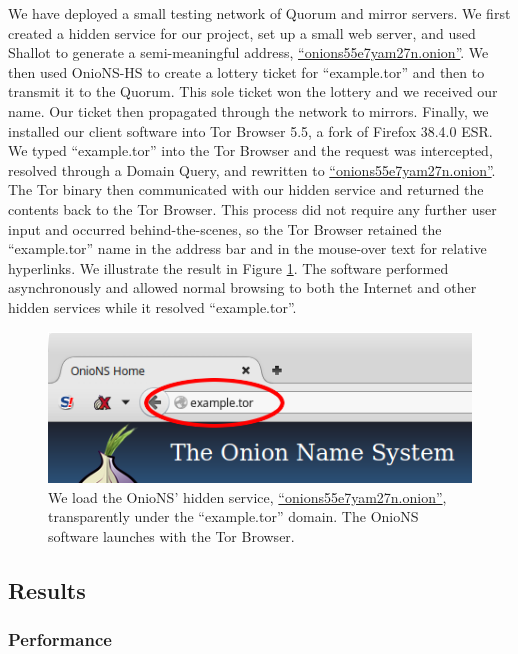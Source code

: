 \documentclass[USenglish,oneside,twocolumn]{article}
\begin{document}
We have deployed a small testing network of Quorum and mirror servers. We first created a hidden service for our project, set up a small web server, and used Shallot to generate a semi-meaningful address, \href{http://onions55e7yam27n.onion}{``onions55e7yam27n.onion''}. We then used OnioNS-HS to create a lottery ticket for ``example.tor'' and then to transmit it to the Quorum. This sole ticket won the lottery and we received our name. Our ticket then propagated through the network to mirrors. Finally, we installed our client software into Tor Browser 5.5, a fork of Firefox 38.4.0 ESR. We typed ``example.tor'' into the Tor Browser and the request was intercepted, resolved through a Domain Query, and rewritten to \href{http://onions55e7yam27n.onion}{``onions55e7yam27n.onion''}. The Tor binary then communicated with our hidden service and returned the contents back to the Tor Browser. This process did not require any further user input and occurred behind-the-scenes, so the Tor Browser retained the ``example.tor'' name in the address bar and in the mouse-over text for relative hyperlinks. We illustrate the result in Figure \ref{fig:prototypeExample}. The software performed asynchronously and allowed normal browsing to both the Internet and other hidden services while it resolved ``example.tor''.

\begin{figure}[h]
	\centering
	\includegraphics[width=\linewidth]{../assets/images/example.png}
	\caption{We load the OnioNS' hidden service, \href{http://onions55e7yam27n.onion}{``onions55e7yam27n.onion''}, transparently under the ``example.tor'' domain. The OnioNS software launches with the Tor Browser.}
	\label{fig:prototypeExample}
\end{figure}

\subsection{Results}

\subsubsection{Performance}
\end{document}
